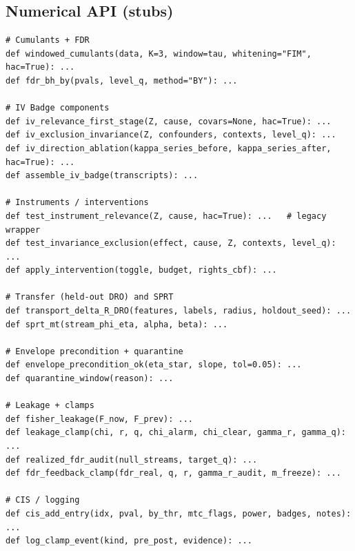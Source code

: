 \subsection*{Numerical API (stubs)}
\begin{lstlisting}
# Cumulants + FDR
def windowed_cumulants(data, K=3, window=tau, whitening="FIM", hac=True): ...
def fdr_bh_by(pvals, level_q, method="BY"): ...

# IV Badge components
def iv_relevance_first_stage(Z, cause, covars=None, hac=True): ...
def iv_exclusion_invariance(Z, confounders, contexts, level_q): ...
def iv_direction_ablation(kappa_series_before, kappa_series_after, hac=True): ...
def assemble_iv_badge(transcripts): ...

# Instruments / interventions
def test_instrument_relevance(Z, cause, hac=True): ...   # legacy wrapper
def test_invariance_exclusion(effect, cause, Z, contexts, level_q): ...
def apply_intervention(toggle, budget, rights_cbf): ...

# Transfer (held-out DRO) and SPRT
def transport_delta_R_DRO(features, labels, radius, holdout_seed): ...
def sprt_mt(stream_phi_eta, alpha, beta): ...

# Envelope precondition + quarantine
def envelope_precondition_ok(eta_star, slope, tol=0.05): ...
def quarantine_window(reason): ...

# Leakage + clamps
def fisher_leakage(F_now, F_prev): ...
def leakage_clamp(chi, r, q, chi_alarm, chi_clear, gamma_r, gamma_q): ...
def realized_fdr_audit(null_streams, target_q): ...
def fdr_feedback_clamp(fdr_real, q, r, gamma_r_audit, m_freeze): ...

# CIS / logging
def cis_add_entry(idx, pval, by_thr, mtc_flags, power, badges, notes): ...
def log_clamp_event(kind, pre_post, evidence): ...
\end{lstlisting}

